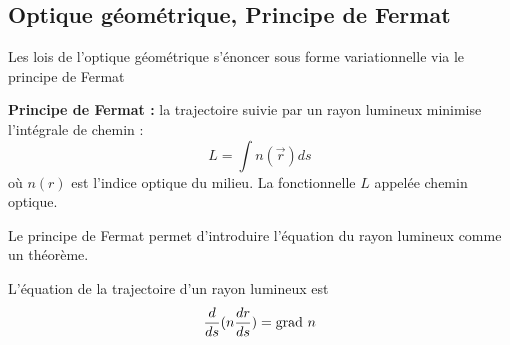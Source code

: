 \documentclass[12pt]{book}
\begin{document}
\subsection{Optique g\'eom\'etrique, Principe de Fermat}\label{secFermat}
Les lois de l'optique g\'eom\'etrique s'\'enoncer sous
forme variationnelle 
via le principe de Fermat\cite{ph:optic:Born65}
\begin{prin}
{\bf Principe de Fermat :} la trajectoire suivie par un rayon
lumineux minimise l'int\'egrale de chemin :
\begin{equation}
L=\int n(\vec r) ds
\end{equation}
o\`u $n(r)$ est l'indice optique du milieu. La
fonctionnelle $L$ 
appel\'ee chemin optique.
\end{prin}
Le principe de Fermat permet d'introduire l'\'equation du rayon
lumineux comme un th\'eor\`eme. 
\begin{thm}
L'\'equation de la trajectoire d'un rayon lumineux est 
\begin{equation}
\frac{d}{ds}(n\frac{dr}{ds})=\grad\ n
\end{equation}
\end{thm}
\end{document}
